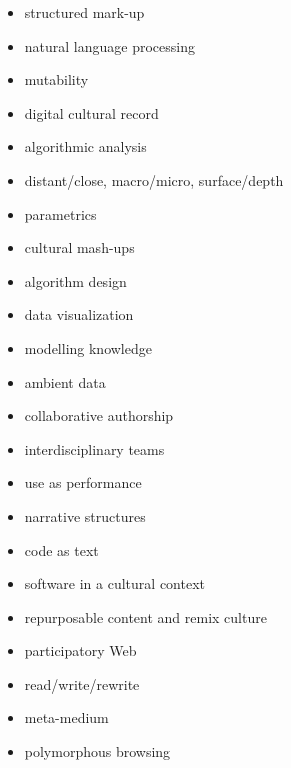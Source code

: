 \begin{itemize}
  \item structured mark-up
  \item	natural language processing
  \item	mutability
  \item	digital cultural record
  \item	algorithmic analysis
  \item distant/close, macro/micro, surface/depth
  \item parametrics
  \item	cultural mash-ups
  \item	algorithm design
  \item data visualization
  \item	modelling knowledge
  \item	ambient data
  \item	collaborative authorship
  \item	interdisciplinary teams
  \item	use as performance
  \item narrative structures
  \item	code as text
  \item	software in a cultural context
  \item repurposable content and remix culture
  \item participatory Web
  \item	read/write/rewrite
  \item	meta-medium
  \item	polymorphous browsing
\end{itemize}




